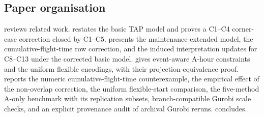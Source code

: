 \subsection*{Paper organisation}

 reviews related work.   restates the
basic TAP model and proves a C1--C4 corner-case correction closed by C1--C5.  
presents the maintenance-extended model, the cumulative-flight-time row correction, and
the induced interpretation updates for C8--C13 under the corrected basic model.
 gives event-aware A-hour constraints and the
uniform flexible encodings, with their projection-equivalence proof.
 reports the numeric cumulative-flight-time
counterexample, the empirical effect of the non-overlap correction, the
uniform flexible-start comparison, the five-method A-only benchmark with its
replication subsets, branch-compatible Gurobi scale checks, and an explicit
provenance audit of archival Gurobi reruns.
 concludes.
